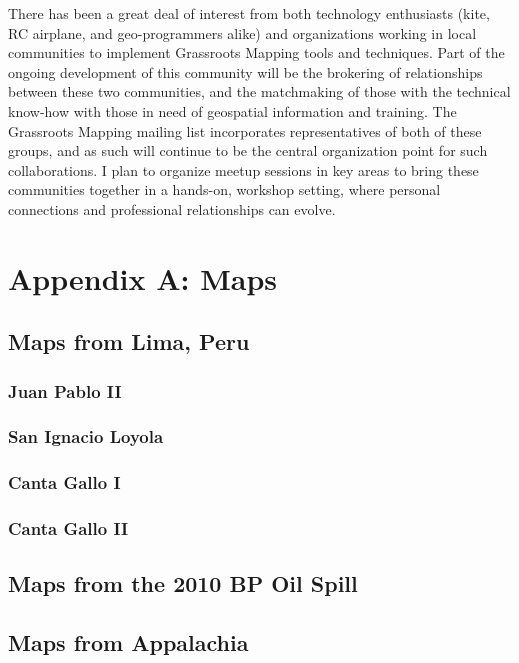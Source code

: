 \documentclass[11pt]{report}
\begin{document}
There has been a great deal of interest from both technology enthusiasts (kite, RC airplane, and geo-programmers alike) and organizations working in local communities to implement Grassroots Mapping tools and techniques. Part of the ongoing development of this community will be the brokering of relationships between these two communities, and the matchmaking of those with the technical know-how with those in need of geospatial information and training. The Grassroots Mapping mailing list incorporates representatives of both of these groups, and as such will continue to be the central organization point for such collaborations. I plan to organize meetup sessions in key areas to bring these communities together in a hands-on, workshop setting, where personal connections and professional relationships can evolve.


\chapter*{Appendix A: Maps}

\section{Maps from Lima, Peru}

\subsection{Juan Pablo II}

\subsection{San Ignacio Loyola}

\subsection{Canta Gallo I}

\subsection{Canta Gallo II}

\section{Maps from the 2010 BP Oil Spill}



\section{Maps from Appalachia}
\end{document}
